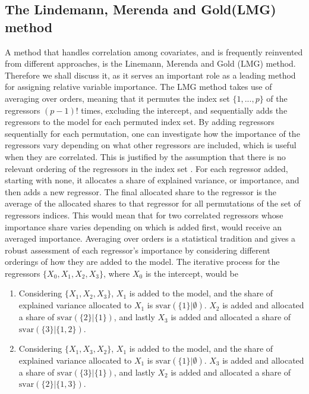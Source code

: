 \subsection{The Lindemann, Merenda and Gold(LMG) method}
\label{sec:lmg}
A method that handles correlation among covariates, and is frequently reinvented \citep{gromping_relaimpo} from different approaches, is the Linemann, Merenda and Gold (LMG) method.
Therefore we shall discuss it, as it serves an important role as a leading method for assigning relative variable importance.  
The LMG method takes use of averaging over orders, meaning that it permutes the index set $\{1, ..., p\}$  of the regressors $(p-1)!$ times, excluding the intercept, and sequentially adds the regressors to the model for each permuted index set.
By adding regressors sequentially for each permutation, one can investigate how the importance of the regressors vary depending on what other regressors are included, which is useful when they are correlated.
This is justified by the assumption that there is no relevant ordering of the regressors in the index set \citep{kruskal_lmg_1987}.
For each regressor added, starting with none, it allocates a share of explained variance, or importance, and then adds a new regressor.
The final allocated share to the regressor is the average of the allocated shares to that regressor for all permutations of the set of regressors indices. 
This would mean that for two correlated regressors whose importance share varies depending on which is added first, would receive an averaged importance.
Averaging over orders is a statistical tradition \citep{kruskal_lmg_1987} and gives a robust assessment of each regressor's importance by considering different orderings of how they are added to the model. 
The iterative process for the regressors $\{X_0, X_1, X_2, X_3\}$, where $X_0$ is the intercept, would be
\begin{enumerate}
    \item Considering $\{X_1, X_2, X_3\}$,  $X_1$ is added to the model, and the share of explained variance allocated to $X_1$ is $\text{svar}(\{1\} \lvert \emptyset)$. $X_2$ is added and allocated a share of $\text{svar}(\{2\} \lvert \{1\})$, and lastly $X_3$ is added and allocated a share of $\text{svar}(\{3\} \lvert \{1, 2\})$.
    \item Considering $\{X_1, X_3, X_2\}$,  $X_1$ is added to the model, and the share of explained variance allocated to $X_1$ is $\text{svar}(\{1\} \lvert \emptyset)$. $X_3$ is added and allocated a share of $\text{svar}(\{3\} \lvert \{1\})$, and lastly $X_2$ is added and allocated a share of $\text{svar}(\{2\} \lvert \{1, 3\})$.
\end{enumerate}
